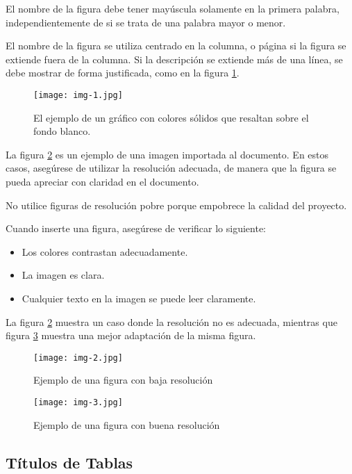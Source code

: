 \documentclass[10pt,twocolumn,letterpaper]{article}
\begin{document}
El nombre de la figura debe tener mayúscula solamente en la primera palabra, independientemente de si se trata de una palabra mayor o menor.

El nombre de la figura se utiliza centrado en la columna, o página si la figura se extiende fuera de la columna. Si la descripción se extiende más de una línea, se debe mostrar de forma justificada, como en la figura \ref{fig:grafico}.

\begin{figure}[h]
	\centering
	\texttt{[image: img-1.jpg]}
	\caption{El ejemplo de un gráfico con colores sólidos que resaltan sobre el fondo blanco.}
	\label{fig:grafico}
\end{figure}

La figura \ref{fig:baja} es un ejemplo de una imagen importada al documento. En estos casos, asegúrese de utilizar la resolución adecuada, de manera que la figura se pueda apreciar con claridad en el documento.

No utilice figuras de resolución pobre porque empobrece la calidad del proyecto.

Cuando inserte una figura, asegúrese de verificar lo siguiente:

\begin{itemize}
	\item Los colores contrastan adecuadamente.
	\item La imagen es clara.
	\item Cualquier texto en la imagen se puede leer claramente.
\end{itemize}

La figura \ref{fig:baja} muestra un caso donde la resolución no es adecuada, mientras que figura \ref{fig:alta} muestra una mejor adaptación de la misma figura.

\begin{figure}[h]
	\centering
	\texttt{[image: img-2.jpg]}
	\caption{Ejemplo de una figura con baja resolución}
	\label{fig:baja}
\end{figure}

\begin{figure}[h]
	\centering
	\texttt{[image: img-3.jpg]}
	\caption{Ejemplo de una figura con buena resolución}
	\label{fig:alta}
\end{figure}

\subsection{Títulos de Tablas}
\end{document}
